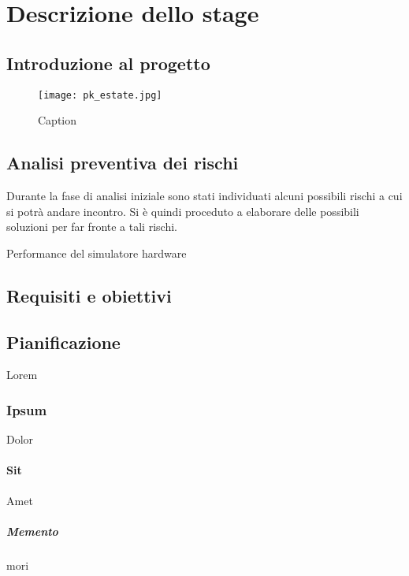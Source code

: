 \chapter{Descrizione dello stage}
\label{cap:descrizione-stage}


\section{Introduzione al progetto}

\begin{figure}[!ht] 
    \centering 
    \texttt{[image: pk\_estate.jpg]} 
    \caption{Caption}
\end{figure}
\lipsum[1]

\section{Analisi preventiva dei rischi}

Durante la fase di analisi iniziale sono stati individuati alcuni possibili rischi a cui si potrà andare incontro.
Si è quindi proceduto a elaborare delle possibili soluzioni per far fronte a tali rischi.

\begin{risk}{Performance del simulatore hardware}
    \label{risk:hardware-simulator} 
\end{risk}

\section{Requisiti e obiettivi}

\section{Pianificazione}
Lorem

\subsection{Ipsum}
Dolor

\subsubsection{Sit}
Amet

\paragraph{Memento}
mori